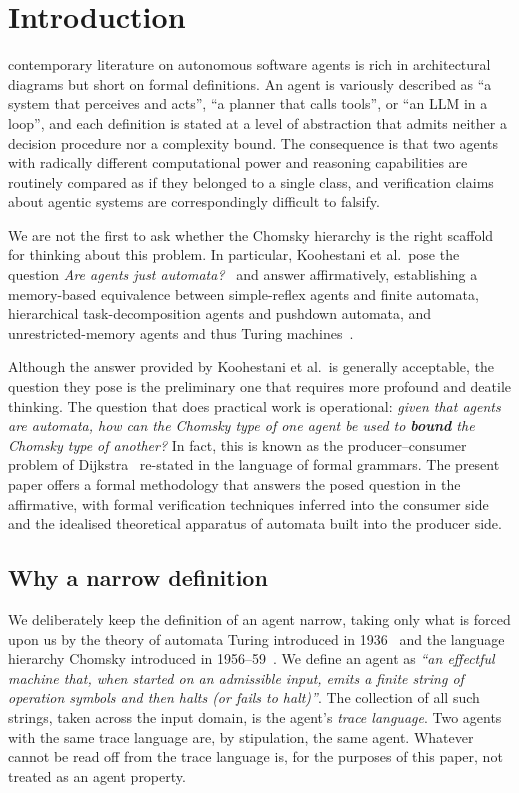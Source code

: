 \section{Introduction}
\label{sec:introduction}

 contemporary literature on autonomous software agents is rich in architectural diagrams but short on formal definitions.  An agent is variously described as ``a system that perceives and acts'', ``a planner that calls tools'', or ``an LLM in a loop'', and each definition is stated at a level of abstraction that admits neither a decision procedure nor a complexity bound.  The consequence is that two agents with radically different computational power and reasoning capabilities are routinely compared as if they belonged to a single class, and verification claims about agentic systems are correspondingly difficult to falsify.

We are not the first to ask whether the Chomsky hierarchy is the right scaffold for thinking about this problem.  In particular, Koohestani et al.\ pose the question \emph{Are agents just automata?}~\cite{koohestani2025automata} and answer affirmatively, establishing a memory-based equivalence between simple-reflex agents and finite automata, hierarchical task-decomposition agents and pushdown automata, and unrestricted-memory agents and thus Turing machines~\cite{turing1936computable}.  

Although the answer provided by Koohestani et al.\ is generally acceptable, the question they pose is the preliminary one that requires more profound and deatile thinking.  The question that does practical work is operational: \emph{given that agents are automata, how can the Chomsky type of one agent be used to \textbf{bound} the Chomsky type of another?}  In fact, this is known as the producer--consumer problem of Dijkstra~\cite{dijkstra1968cooperating} re-stated in the language of formal grammars.  The present paper offers a formal methodology that answers the posed question in the affirmative, with formal verification techniques inferred into the consumer side and the idealised theoretical apparatus of automata built into the producer side.

\subsection{Why a narrow definition}

We deliberately keep the definition of an agent narrow, taking
only what is forced upon us by the theory of automata Turing
introduced in 1936~\cite{turing1936computable} and the language
hierarchy Chomsky introduced in
1956--59~\cite{chomsky1956three,chomsky1959certain}.  We define an agent as {\it ``an effectful machine that, when started on an
admissible input, emits a finite string of operation symbols and
then halts (or fails to halt)''}.  The collection of all such
strings, taken across the input domain, is the agent's
\emph{trace language}.  Two agents with the same trace language
are, by stipulation, the same agent.  Whatever cannot be read off
from the trace language is, for the purposes of this paper, not
treated as an agent property.

